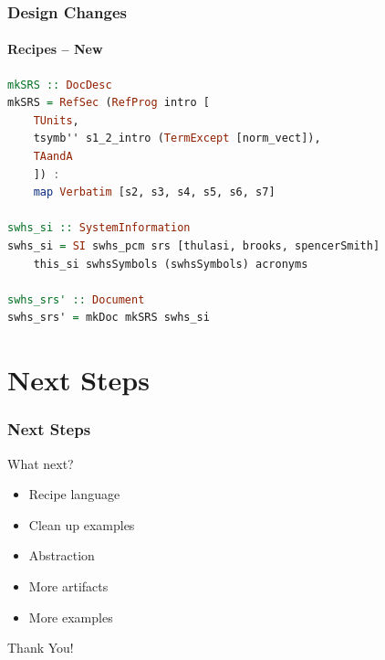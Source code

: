 \documentclass{beamer}
\begin{document}
\begin{frame}[fragile]

\frametitle{Design Changes}
\framesubtitle{Recipes -- New}

\begin{lstlisting}[language=Haskell, frame=single, showstringspaces=false, basicstyle=\scriptsize]
mkSRS :: DocDesc
mkSRS = RefSec (RefProg intro [
	TUnits, 
	tsymb'' s1_2_intro (TermExcept [norm_vect]),
	TAandA
	]) : 
	map Verbatim [s2, s3, s4, s5, s6, s7]

swhs_si :: SystemInformation
swhs_si = SI swhs_pcm srs [thulasi, brooks, spencerSmith] 
	this_si swhsSymbols (swhsSymbols) acronyms 

swhs_srs' :: Document
swhs_srs' = mkDoc mkSRS swhs_si
\end{lstlisting} 
\end{frame}


\section[Next Steps]{Next Steps}


\begin{frame}

\frametitle{Next Steps}


\begin{Large}
What next?
\end{Large}

\begin{itemize}
\item Recipe language %
\item Clean up examples
\item Abstraction
\item More artifacts
\item More examples
\end{itemize}
\end{frame}


\begin{frame}
\begin{center}
\Huge Thank You!
\end{center}
\end{frame}

\end{document}
